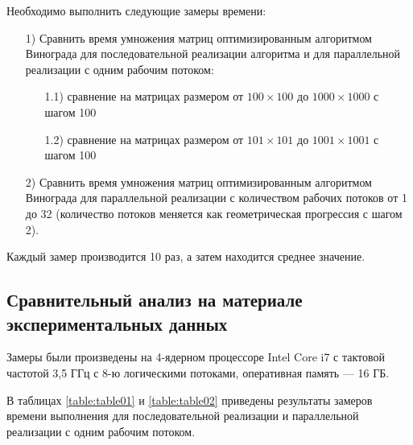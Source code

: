 \documentclass[a4paper,14pt]{article}
\begin{document}
    Необходимо выполнить следующие замеры времени:
    \begin{enumerate} 
        \item[1)] Сравнить время умножения матриц оптимизированным алгоритмом Винограда для последовательной реализации алгоритма и для параллельной реализации с одним рабочим потоком:
        \begin{enumerate}
        \item[1.1)] сравнение на матрицах размером от $100 \times 100$ до $1000 \times 1000$ с шагом 100
        \item[1.2)] сравнение на матрицах размером от $101 \times 101$ до $1001 \times 1001$ с шагом 100
        \end{enumerate}
        \item[2)] Сравнить время умножения матриц оптимизированным алгоритмом Винограда для параллельной реализации с количеством рабочих потоков от 1 до 32 (количество потоков меняется как геометрическая прогрессия с шагом 2).
    \end{enumerate}
    
    Каждый замер производится 10 раз, а затем находится среднее значение. 
    
    
    \subsection{Сравнительный анализ на материале экспериментальных данных}
    	Замеры были произведены на 4-ядерном процессоре Intel Core i7 с тактовой частотой 3,5 ГГц с 8-ю логическими потоками, оперативная память — 16 ГБ.
    	
    	В таблицах \ref{table:table01} и  \ref{table:table02} приведены результаты замеров времени выполнения для последовательной реализации и параллельной реализации с одним рабочим потоком.
    	
\end{document}
